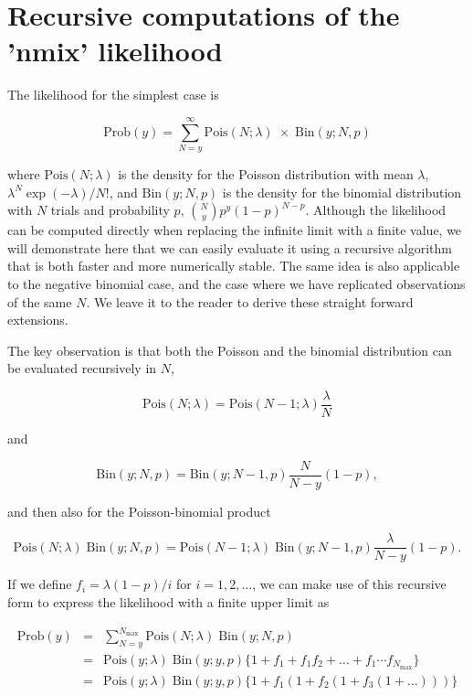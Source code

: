 \documentclass[codesnippet]{jss}
\begin{document}
\section{Recursive computations of the 'nmix' likelihood}
The likelihood for the simplest case is

\begin{equation} \label{6}
	\text{Prob}(y) = \sum_{N = y}^{\infty}
	\text{Pois}(N ; \lambda) \;\times\; \text{Bin}(y;  N, p)
\end{equation}

where $\text{Pois}(N; \lambda)$ is the density for the Poisson distribution 
with mean $\lambda$, $\lambda^{N}\exp(-\lambda)/N!$, and $\text{Bin}(y; N, 
p)$ is the density for the binomial distribution with $N$ trials and 
probability $p$, ${N \choose y} p^{y}(1-p)^{N-p}$. Although the likelihood 
can be computed directly when replacing the infinite limit with a finite 
value, we will demonstrate here that we can easily evaluate it using a 
recursive algorithm that is both faster and more numerically stable. The 
same idea is also applicable to the negative binomial case, and the case 
where we have replicated observations of the same $N$. We leave it to the 
reader to derive these straight forward extensions.

The key observation is that both the Poisson and the binomial distribution 
can be evaluated recursively in $N$,

\begin{equation} \label{7}
	\text{Pois}(N; \lambda) = \text{Pois}(N-1; \lambda) \frac{\lambda}{N}
\end{equation}

and

\begin{equation} \label{8}
	\text{Bin}(y; N, p) = \text{Bin}(y; N-1, p) \frac{N}{N-y}(1-p),
\end{equation}

and then also for the Poisson-binomial product

\begin{equation}\label{9}
	\text{Pois}(N ; \lambda) \; \text{Bin}(y; N, p)
	=
	\text{Pois}(N-1; \lambda) \; \text{Bin}(y; N-1, p)
	\frac{\lambda}{N-y}(1-p).
\end{equation}

If we define $f_i = \lambda(1-p)/i$ for $i=1, 2, \ldots$, we can make use of 
this recursive form to express the likelihood with a finite upper limit as

\begin{eqnarray} \label{10}
	\text{Prob}(y) &=& \sum_{N = y}^{N_{\text{max}}}
	\text{Pois}(N ; \lambda)\;
	\text{Bin}(y; N, p) \nonumber\\
	&=& \text{Pois}(y; \lambda)\; \text{Bin}(y; y, p)
	\Big\{ 1 + f_1 + f_1f_2 +
	\ldots
	+f_1\cdots f_{N_\text{max}}
	\Big\} \nonumber\\
	&=& \text{Pois}(y; \lambda)\; \text{Bin}(y; y, p)
	\Big\{ 1 + f_1(1+f_2(1+f_3(1+ \dots)))\Big\}\nonumber
\end{eqnarray}
\end{document}
